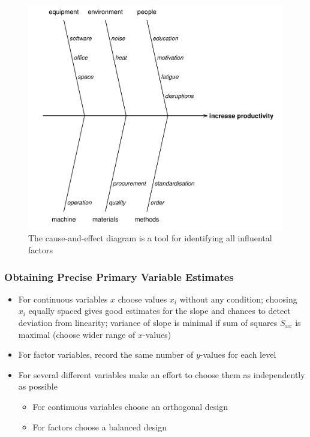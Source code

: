\documentclass[11pt]{article}
\theoremstyle{definition}
\begin{document}
\begin{figure}[H]
	\centering
	\includegraphics[width=0.6\linewidth]{img/cause_and_effect_diagram}
	\caption{The cause-and-effect diagram is a tool for identifying all influental factors}
	\label{fig:causeandeffectdiagram}
\end{figure}

\subsubsection{Obtaining Precise Primary Variable Estimates}
\begin{itemize}
	\item For continuous variables $x$ choose values $x_i$ without any condition; choosing $x_i$ equally spaced gives good estimates for the slope and chances to detect deviation from linearity; variance of slope is minimal if sum of squares $S_{xx}$ is maximal (choose wider range of $x$-values)
	\item For factor variables, record the same number of $y$-values for each level
	\item For several different variables make an effort to choose them as independently as possible
	\begin{itemize}[nosep]
		\item For continuous variables choose an orthogonal design
		\item For factors choose a balanced design
	\end{itemize}
\end{itemize}
\end{document}
